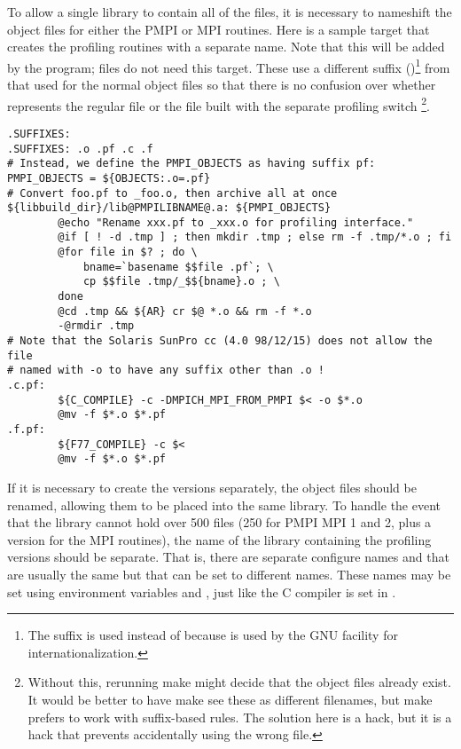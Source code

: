 \documentclass{article}
\begin{document}
To allow a single library to contain all of the files, it is necessary to
nameshift the object files for either the PMPI or MPI routines.  
Here is a sample  target that creates the profiling routines
with a separate name.  Note that this will be added by the 
program;  files do not need this target.
These use a different suffix ()\footnote{The suffix 
is used instead of  
because  is used by the GNU  facility for
internationalization.}
from that used
for the normal object files so that there is no confusion over whether
 represents the regular file or the file built with the separate
profiling switch \footnote{Without this, rerunning
  make might decide that the object files already exist.  It would be better
  to have make see these as different filenames, but make prefers to work with
  suffix-based rules.  The solution here is a hack, but it is a hack that
  prevents accidentally using the wrong file.}.

%
\begin{verbatim}
.SUFFIXES:
.SUFFIXES: .o .pf .c .f
# Instead, we define the PMPI_OBJECTS as having suffix pf:
PMPI_OBJECTS = ${OBJECTS:.o=.pf}
# Convert foo.pf to _foo.o, then archive all at once
${libbuild_dir}/lib@PMPILIBNAME@.a: ${PMPI_OBJECTS}
        @echo "Rename xxx.pf to _xxx.o for profiling interface."
        @if [ ! -d .tmp ] ; then mkdir .tmp ; else rm -f .tmp/*.o ; fi
        @for file in $? ; do \
            bname=`basename $$file .pf`; \
            cp $$file .tmp/_$${bname}.o ; \
        done
        @cd .tmp && ${AR} cr $@ *.o && rm -f *.o
        -@rmdir .tmp
# Note that the Solaris SunPro cc (4.0 98/12/15) does not allow the file
# named with -o to have any suffix other than .o !
.c.pf:
        ${C_COMPILE} -c -DMPICH_MPI_FROM_PMPI $< -o $*.o
        @mv -f $*.o $*.pf
.f.pf:
        ${F77_COMPILE} -c $<
        @mv -f $*.o $*.pf
\end{verbatim}

If it is necessary to create the  versions separately, the
object files should be renamed, allowing them to be placed into the
same library.  To handle the event that the library cannot hold over
500 files (250 for PMPI MPI 1 and 2, plus a version for the MPI
routines), the name of the library containing the profiling versions
should be separate.  That is, there are separate configure names
 and  that are usually the same but that
can be set to different names.  These names may be set using environment
variables \code{MPILIBNAME} and \code{PMPILIBNAME}, just like the C compiler
is set in \code{configure}.
\end{document}
